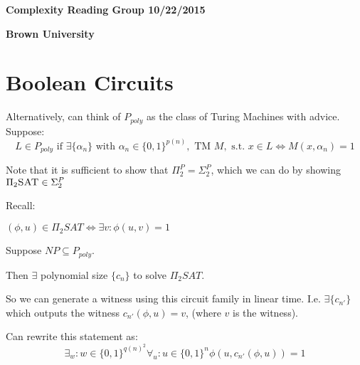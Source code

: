 \documentclass[11pt]{article} %
\begin{document}
\centerline{\LARGE{\bf Complexity Reading Group 10/22/2015}}
\vspace{2mm}
\centerline{\Large {\bf Brown University}}

\section{Boolean Circuits}



Alternatively, can think of $P_{poly}$ as the class of Turing Machines with advice. Suppose:
\begin{equation}
L \in P_{poly} \text{ if } \exists \{\alpha_n\} \text{ with } \alpha_n \in \{0,1\}^{p(n)}, \text{ TM } M, \text{ s.t. } x \in L \iff M(x, \alpha_n) = 1
\end{equation}


 Note that it is sufficient to show that $\Pi_2^P = \Sigma_2^P$, which we can do by showing $\Pi_2\textsc{SAT} \in \Sigma_2^P$

Recall:

$(\phi, u) \in \Pi_2 SAT \iff \exists v : \phi(u,v) = 1$

Suppose $NP \subseteq P_{poly}$.

Then $\exists$ polynomial size $\{c_n\}$ to solve $\Pi_2 SAT$.

So we can generate a witness using this circuit family in linear time. I.e. $\exists \{c_{n'}\}$ which outputs the witness $c_{n'}(\phi,u) = v$, (where $v$ is the witness).

Can rewrite this statement as:
\begin{equation}
\exists_w : w \in \{0,1\}^{q(n)^2} \forall_u : u \in \{0,1\}^n \phi(u, c_{n'}(\phi, u)) = 1
\label{eq:conc}
\end{equation}
\end{document}
